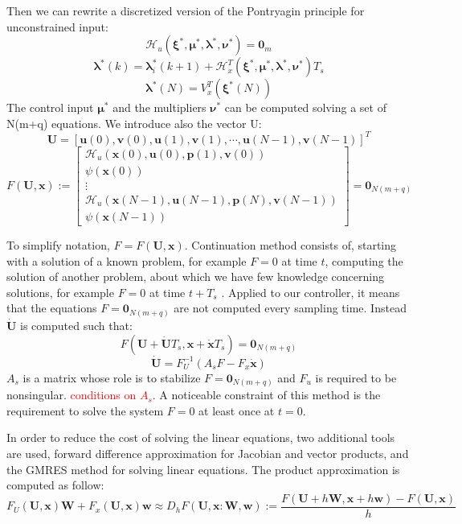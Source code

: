 \documentclass[a4paper, 12pt]{report}
\begin{document}
Then we can rewrite a discretized version of the Pontryagin principle for unconstrained input:
\[ \mathcal{H}_u(\boldsymbol{\xi}^*, \boldsymbol{\mu}^*, \boldsymbol{\lambda}^*, \boldsymbol{\nu}^*) = \boldsymbol{0}_m \]
\[ \boldsymbol{\lambda}^*(k)  = \boldsymbol{\lambda}_i^*(k+1) + \mathcal{H}_x^T(\boldsymbol{\xi}^*, \boldsymbol{\mu}^*, \boldsymbol{\lambda}^*, \boldsymbol{\nu}^*) T_s\]
\[ \boldsymbol{\lambda}^*(N) = V_x^T(\boldsymbol{\xi}^*(N)) \]
The control input $\boldsymbol{\mu}^*$ and the multipliers $\boldsymbol{\nu}^*$ can be computed solving a set of N(m+q) equations. We introduce also the vector U:
\[\boldsymbol{U} = [\boldsymbol{u}(0), \boldsymbol{v}(0), \boldsymbol{u}(1), \boldsymbol{v}(1), \cdots, \boldsymbol{u}(N-1), \boldsymbol{v}(N-1)]^T \]
\[F(\boldsymbol{U},\boldsymbol{x}) := \begin{bmatrix} \mathcal{H}_u(\boldsymbol{x}(0), \boldsymbol{u}(0), \boldsymbol{p}(1), \boldsymbol{v}(0)) \\ \psi(\boldsymbol{x}(0)) \\ \vdots \\ \mathcal{H}_u (\boldsymbol{x}(N-1), \boldsymbol{u}(N-1), \boldsymbol{p}(N), \boldsymbol{v}(N-1)) \\ \psi(\boldsymbol{x}(N-1))\end{bmatrix} = \boldsymbol{0}_{N(m+q)}\]

To simplify notation, $F = F(\boldsymbol{U},\boldsymbol{x})$. Continuation method consists of, starting with a solution of a known problem, for example $F = 0$ at time $t$, computing the solution of another problem, about which we have few knowledge concerning solutions, for example $F = 0$ at time $t + T_s$ \cite{Allgower1987}. Applied to our controller, it means that the equations $F = \boldsymbol{0}_{N(m+q)}$ are not computed every sampling time. Instead $\boldsymbol{\dot U}$ is computed such that:
\[ F(\boldsymbol{U} + \boldsymbol{\dot U}T_s,\boldsymbol{x} + \boldsymbol{\dot x} T_s) = \boldsymbol{0}_{N(m+q)} \]
\[ \boldsymbol{\dot U} = F_U^{-1}(A_s F - F_x \boldsymbol{\dot x}) \]
$A_s$ is a matrix whose role is to stabilize $F = \boldsymbol{0}_{N(m+q)}$ and $F_u$ is required to be nonsingular. \textcolor{red}{conditions on $A_s$}. A noticeable constraint of this method is the requirement to solve the system $F=0$ at least once at $t=0$.

In order to reduce the cost of solving the linear equations, two additional tools are used, forward difference approximation for Jacobian and vector products, and the GMRES method for solving linear equations.
The product approximation is computed as follow:
\[ F_U(\boldsymbol{U}, \boldsymbol{x}) \boldsymbol{W} + F_x(\boldsymbol{U}, \boldsymbol{x}) \boldsymbol{w} \approx D_h F(\boldsymbol{U}, \boldsymbol{x} : \boldsymbol{W}, \boldsymbol{w}) := \frac{F(\boldsymbol{U} + h\boldsymbol{W}, \boldsymbol{x} + h\boldsymbol{w}) - F(\boldsymbol{U}, \boldsymbol{x})}{h} \]
\end{document}
